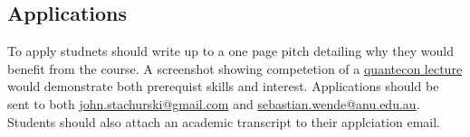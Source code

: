 \documentclass[12pt]{article}
\numberwithin{equation}{section}		%
\numberwithin{table}{section}				%
\begin{document}
\subsection*{Applications}

To apply studnets should write up to a one page pitch detailing why they would benefit from the course. A screenshot showing competetion of a \href{https://lectures.quantecon.org/py/}{quantecon lecture} would demonstrate both prerequist skills and interest. 
Applications should be sent to both \href{mailto:john.stachurski@gmail.com}{john.stachurski@gmail.com} and \href{mailto:sebastian.wende@anu.edu.au}{sebastian.wende@anu.edu.au}. Students should also attach an academic transcript to their applciation email.
\end{document}

